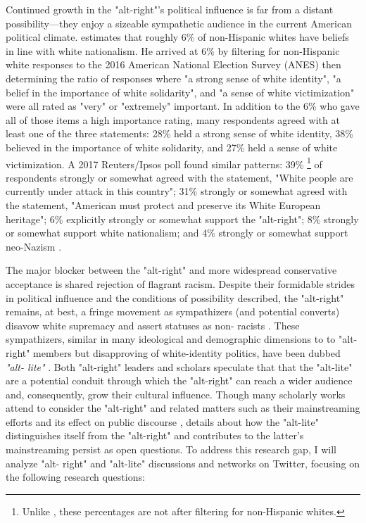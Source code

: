 \documentclass[acmlarge, screen, authorversion]{acmart}
\begin{document}
Continued growth in the "alt-right"'s political influence is far from a distant
possibility---they enjoy a sizeable sympathetic audience in the current
American political climate. \citet{hawleyDemographyAltRight2018} estimates that
roughly 6\% of non-Hispanic whites have beliefs in line with white nationalism.
He arrived at 6\% by filtering for non-Hispanic white responses to the 2016
American National Election Survey (ANES) then determining the ratio of
responses where "a strong sense of white identity", "a belief in the importance
of white solidarity", and "a sense of white victimization" were all rated as
"very" or "extremely" important. In addition to the 6\% who gave all of those items a
high importance rating, many respondents agreed with at least one of the three
statements: 28\% held a strong sense of white identity, 38\% believed in the
importance of white solidarity, and 27\% held a sense of white victimization. A
2017 Reuters/Ipsos poll found similar patterns: 39\% \footnote{Unlike
\citet{hawleyDemographyAltRight2018}, these percentages are not after filtering
for non-Hispanic whites.} of respondents strongly or somewhat agreed with the
statement, "White people are currently under attack in this country"; 31\%
strongly or somewhat agreed with the statement, "American must protect and
preserve its White European heritage"; 6\% explicitly strongly or somewhat
support the "alt-right"; 8\% strongly or somewhat support white nationalism;
and 4\% strongly or somewhat support neo-Nazism \cite{politicsNewPollAmericans}.

The major blocker between the "alt-right" and more widespread conservative
acceptance is shared
rejection of flagrant racism. Despite their formidable strides in political
influence and the
conditions of possibility described, the "alt-right" remains, at best, a fringe movement
as sympathizers (and potential converts) disavow white supremacy and assert statuses as non-
racists \cite{mainRiseAltRight2018,
hawleyAltRightWhatEveryone2018}.
These sympathizers, similar in many ideological and demographic dimensions to
to "alt-right" members
but disapproving of white-identity politics, have been dubbed \textit{"alt-
lite"}
\cite{mainRiseAltRight2018, hawleyAltRightWhatEveryone2018}. Both "alt-right"
leaders and scholars
speculate that that the "alt-lite" are a potential conduit through which the
"alt-right" can reach a wider audience and, consequently, grow their cultural
influence. Though many scholarly works attend to consider the "alt-right" \cite{mainRiseAltRight2018,
hawleyMakingSenseAltright2017, nagleKillAllNormies2017}
and related matters such as their mainstreaming
efforts \cite{gallaherMainstreamingWhiteSupremacy2020} and its effect on public
discourse
\cite{sternProudBoysWhite2019, cammaertsMainstreamingExtremeRightWing2018},
details about how the
"alt-lite" distinguishes itself from the "alt-right" and contributes to the
latter's mainstreaming
persist as open questions. To address this research gap, I will analyze "alt-
right" and "alt-lite"
discussions and networks on Twitter, focusing on the following research
questions:
\end{document}
